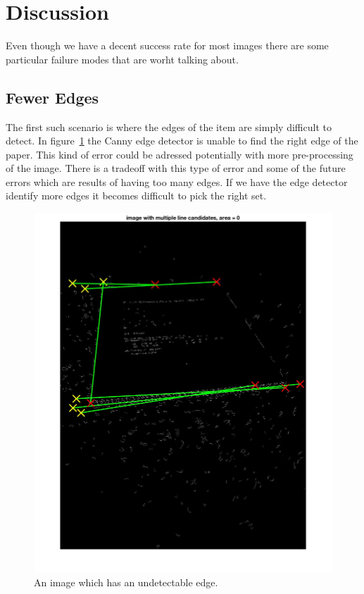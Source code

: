 \section{Discussion}
\label{sec:discuss}

Even though we have a decent success rate for most images there are some particular failure modes that are worht talking about.

\subsection{Fewer Edges}
The first such scenario is where the edges of the item are simply difficult to detect.
In figure~\ref{fig:missedEdge} the Canny edge detector is unable to find the right edge of the paper.
This kind of error could be adressed potentially with more pre-processing of the image.
There is a tradeoff with this type of error and some of the future errors which are results of having too many edges.
If we have the edge detector identify more edges it becomes difficult to pick the right set.

\begin{figure}[t]
\begin{center}
   \includegraphics[width=0.8\linewidth]{figures/missedEdge.jpg}
\end{center}
\caption{An image which has an undetectable edge.}
\label{fig:missedEdge}
\end{figure}


